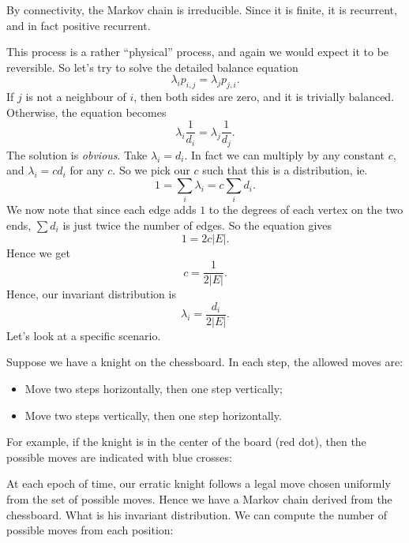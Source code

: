 \documentclass[a4paper]{article}
\begin{document}
\begin{eg}
  By connectivity, the Markov chain is irreducible. Since it is finite, it is recurrent, and in fact positive recurrent.

  This process is a rather ``physical'' process, and again we would expect it to be reversible. So let's try to solve the detailed balance equation
  \[
    \lambda_i p_{i, j} = \lambda_j p_{j, i}.
  \]
  If $j$ is not a neighbour of $i$, then both sides are zero, and it is trivially balanced. Otherwise, the equation becomes
  \[
    \lambda_i \frac{1}{d_i} = \lambda_j \frac{1}{d_j}.
  \]
  The solution is \emph{obvious}. Take $\lambda_i = d_i$. In fact we can multiply by any constant $c$, and $\lambda_i = c d_i$ for any $c$. So we pick our $c$ such that this is a distribution, ie.
  \[
    1 = \sum_i \lambda_i = c \sum_i d_i.
  \]
  We now note that since each edge adds $1$ to the degrees of each vertex on the two ends, $\sum d_i$ is just twice the number of edges. So the equation gives
  \[
    1 = 2c |E|.
  \]
  Hence we get
  \[
    c = \frac{1}{2|E|}.
  \]
  Hence, our invariant distribution is
  \[
    \lambda_i = \frac{d_i}{2|E|}.
  \]
  Let's look at a specific scenario.

  Suppose we have a knight on the chessboard. In each step, the allowed moves are:
  \begin{itemize}
    \item Move two steps horizontally, then one step vertically;
    \item Move two steps vertically, then one step horizontally.
  \end{itemize}
  For example, if the knight is in the center of the board (red dot), then the possible moves are indicated with blue crosses:
  \begin{center}
  \end{center}
  At each epoch of time, our erratic knight follows a legal move chosen uniformly from the set of possible moves. Hence we have a Markov chain derived from the chessboard. What is his invariant distribution. We can compute the number of possible moves from each position:
  \begin{center}
\end{center}
\end{eg}
\end{document}
